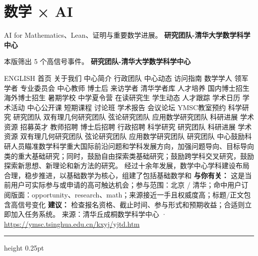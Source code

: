 \documentclass[10.5pt]{ctexart}
\begin{document}
\section*{数学 × AI}
{\color{ormuted} AI for Mathematics、Lean、证明与重要数学进展。}
\vspace{2mm}
{\LARGE\bfseries 研究团队-清华大学数学科学中心}\par
\vspace{1mm}
{\color{ormuted} 本版筛出 5 个高信号事件。}
\vspace{3mm}
{\Large\bfseries 研究团队-清华大学数学科学中心}\par
ENGLISH 首页 关于我们 中心简介 行政团队 中心动态 访问指南 数学学人 领军学者 专业委员会 中心教师 博士后 来访学者 清华学者库 人才培养 国内博士招生 海外博士招生 暑期学校 中学夏令营 在读研究生 学生动态 人才跟踪 学术日历 学术活动 中心公开课 短期课程 讨论班 学术报告 会议论坛 YMSC教室预约 科学研究 研究团队 双有理几何研究团队 弦论研究团队 应用数学研究团队 科研进展 学术资源 招募英才 教师招聘 博士后招聘 行政招聘 科学研究 研究团队 科研进展 学术资源 双有理几何研究团队 弦论研究团队 应用数学研究团队 研究团队 中心鼓励科研人员瞄准数学科学重大国际前沿问题和学科发展方向，加强问题导向、目标导向类的重大基础研究；同时，鼓励自由探索类基础研究；鼓励跨学科交叉研究，鼓励探索新思想、新理论和新方法的研究。 经过十余年发展，数学中心学科建设布局合理，稳步推进，以基础数学为核心，组建了包括基础数学和
\textbf{与你有关：} 这是当前用户可实际参与或申请的高可触达机会；参与范围：北京 / 清华；命中用户订阅版面：opportunity、research、math；来源接近一手且权威度高；标题/正文包含高信号变化
\textbf{建议：} 检查报名资格、截止时间、参与形式和预期收益；合适则立即加入任务系统。
{\footnotesize\color{ormuted} 来源：清华丘成桐数学科学中心 · \url{https://ymsc.tsinghua.edu.cn/kxyj/yjtd.htm}}
\vspace{4mm}
\hrule height 0.25pt
\vspace{3mm}
\end{document}

